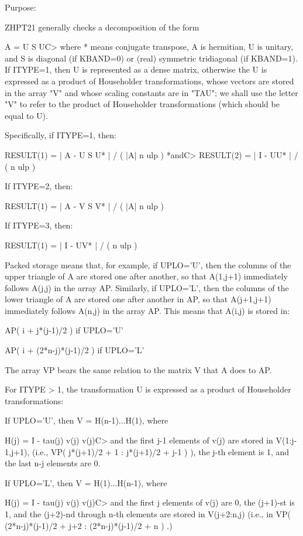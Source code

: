 \begin{DoxyParagraph}{Purpose\+: }
\begin{DoxyVerb} ZHPT21  generally checks a decomposition of the form

         A = U S UC>
 where * means conjugate transpose, A is hermitian, U is
 unitary, and S is diagonal (if KBAND=0) or (real) symmetric
 tridiagonal (if KBAND=1).  If ITYPE=1, then U is represented as
 a dense matrix, otherwise the U is expressed as a product of
 Householder transformations, whose vectors are stored in the
 array "V" and whose scaling constants are in "TAU"; we shall
 use the letter "V" to refer to the product of Householder
 transformations (which should be equal to U).

 Specifically, if ITYPE=1, then:

         RESULT(1) = | A - U S U* | / ( |A| n ulp ) *andC>         RESULT(2) = | I - UU* | / ( n ulp )

 If ITYPE=2, then:

         RESULT(1) = | A - V S V* | / ( |A| n ulp )

 If ITYPE=3, then:

         RESULT(1) = | I - UV* | / ( n ulp )

 Packed storage means that, for example, if UPLO='U', then the columns
 of the upper triangle of A are stored one after another, so that
 A(1,j+1) immediately follows A(j,j) in the array AP.  Similarly, if
 UPLO='L', then the columns of the lower triangle of A are stored one
 after another in AP, so that A(j+1,j+1) immediately follows A(n,j)
 in the array AP.  This means that A(i,j) is stored in:

    AP( i + j*(j-1)/2 )                 if UPLO='U'

    AP( i + (2*n-j)*(j-1)/2 )           if UPLO='L'

 The array VP bears the same relation to the matrix V that A does to
 AP.

 For ITYPE > 1, the transformation U is expressed as a product
 of Householder transformations:

    If UPLO='U', then  V = H(n-1)...H(1),  where

        H(j) = I  -  tau(j) v(j) v(j)C>
    and the first j-1 elements of v(j) are stored in V(1:j-1,j+1),
    (i.e., VP( j*(j+1)/2 + 1 : j*(j+1)/2 + j-1 ) ),
    the j-th element is 1, and the last n-j elements are 0.

    If UPLO='L', then  V = H(1)...H(n-1),  where

        H(j) = I  -  tau(j) v(j) v(j)C>
    and the first j elements of v(j) are 0, the (j+1)-st is 1, and the
    (j+2)-nd through n-th elements are stored in V(j+2:n,j) (i.e.,
    in VP( (2*n-j)*(j-1)/2 + j+2 : (2*n-j)*(j-1)/2 + n ) .)\end{DoxyVerb}
 
\end{DoxyParagraph}

